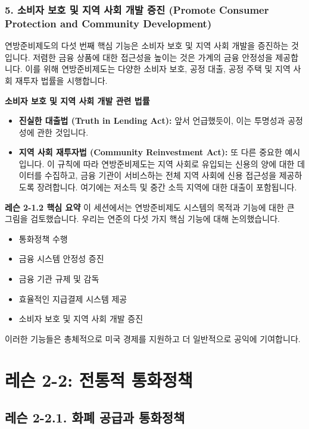 \documentclass[11pt,a4paper]{book}
\theoremstyle{definition}
\begin{document}
\subsubsection*{5. 소비자 보호 및 지역 사회 개발 증진 (Promote Consumer Protection and Community Development)}
연방준비제도의 다섯 번째 핵심 기능은 소비자 보호 및 지역 사회 개발을 증진하는 것입니다. 저렴한 금융 상품에 대한 접근성을 높이는 것은 가계의 금융 안정성을 제공합니다. 이를 위해 연방준비제도는 다양한 소비자 보호, 공정 대출, 공정 주택 및 지역 사회 재투자 법률을 시행합니다.

\begin{examplebox}
\textbf{소비자 보호 및 지역 사회 개발 관련 법률}
\begin{itemize}
    \item \textbf{진실한 대출법 (Truth in Lending Act):} 앞서 언급했듯이, 이는 투명성과 공정성에 관한 것입니다.
    \item \textbf{지역 사회 재투자법 (Community Reinvestment Act):} 또 다른 중요한 예시입니다. 이 규칙에 따라 연방준비제도는 지역 사회로 유입되는 신용의 양에 대한 데이터를 수집하고, 금융 기관이 서비스하는 전체 지역 사회에 신용 접근성을 제공하도록 장려합니다. 여기에는 저소득 및 중간 소득 지역에 대한 대출이 포함됩니다.
\end{itemize}
\end{examplebox}

\begin{summarybox}
\textbf{레슨 2-1.2 핵심 요약}
이 세션에서는 연방준비제도 시스템의 목적과 기능에 대한 큰 그림을 검토했습니다. 우리는 연준의 다섯 가지 핵심 기능에 대해 논의했습니다.
\begin{itemize}
    \item 통화정책 수행
    \item 금융 시스템 안정성 증진
    \item 금융 기관 규제 및 감독
    \item 효율적인 지급결제 시스템 제공
    \item 소비자 보호 및 지역 사회 개발 증진
\end{itemize}
이러한 기능들은 총체적으로 미국 경제를 지원하고 더 일반적으로 공익에 기여합니다.
\end{summarybox}


\section{레슨 2-2: 전통적 통화정책}

\subsection{레슨 2-2.1. 화폐 공급과 통화정책}
\end{document}
